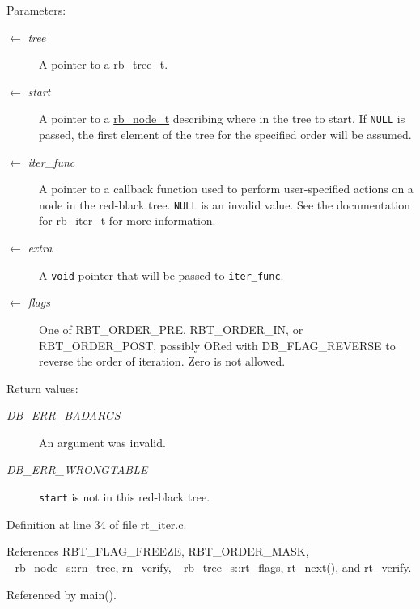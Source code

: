 \begin{Desc}
\item[Parameters:]
\begin{description}
\item[\mbox{$\leftarrow$} {\em tree}]A pointer to a \hyperlink{group__dbprim__rbtree_ga0}{rb\_\-tree\_\-t}. \item[\mbox{$\leftarrow$} {\em start}]A pointer to a \hyperlink{group__dbprim__rbtree_ga1}{rb\_\-node\_\-t} describing where in the tree to start. If {\tt NULL} is passed, the first element of the tree for the specified order will be assumed. \item[\mbox{$\leftarrow$} {\em iter\_\-func}]A pointer to a callback function used to perform user-specified actions on a node in the red-black tree. {\tt NULL} is an invalid value. See the documentation for \hyperlink{group__dbprim__rbtree_ga2}{rb\_\-iter\_\-t} for more information. \item[\mbox{$\leftarrow$} {\em extra}]A {\tt void} pointer that will be passed to {\tt iter\_\-func}. \item[\mbox{$\leftarrow$} {\em flags}]One of RBT\_\-ORDER\_\-PRE, RBT\_\-ORDER\_\-IN, or RBT\_\-ORDER\_\-POST, possibly ORed with DB\_\-FLAG\_\-REVERSE to reverse the order of iteration. Zero is not allowed.\end{description}
\end{Desc}
\begin{Desc}
\item[Return values:]
\begin{description}
\item[{\em DB\_\-ERR\_\-BADARGS}]An argument was invalid. \item[{\em DB\_\-ERR\_\-WRONGTABLE}]{\tt start} is not in this red-black tree.\end{description}
\end{Desc}


Definition at line 34 of file rt\_\-iter.c.

References RBT\_\-FLAG\_\-FREEZE, RBT\_\-ORDER\_\-MASK, \_\-rb\_\-node\_\-s::rn\_\-tree, rn\_\-verify, \_\-rb\_\-tree\_\-s::rt\_\-flags, rt\_\-next(), and rt\_\-verify.

Referenced by main().

